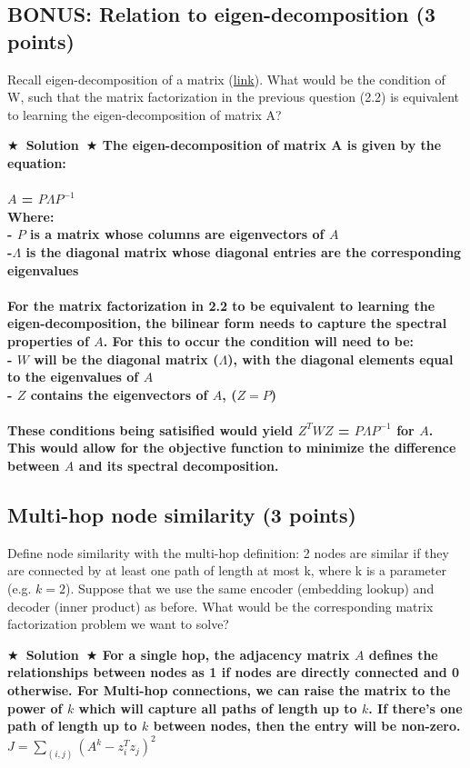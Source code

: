 \documentclass{article}
\numberwithin{figure}{section}
\newcommand{\Solution}[1]{{\medskip \color{red} \bf $\bigstar$~\sf \textbf{Solution}~$\bigstar$ \sf #1 } \bigskip}
\begin{document}
\subsection{BONUS: Relation to eigen-decomposition (3 points)}
Recall eigen-decomposition of a matrix (\href{https://en.wikipedia.org/wiki/Eigendecomposition_of_a_matrix}{link}). What would be the condition of W, such that the matrix factorization in the previous question (2.2) is equivalent to learning the eigen-decomposition of matrix A?

\Solution{
The eigen-decomposition of matrix A is given by the equation: \\
\\
$A$ = $PΛP^{-1}$ \\
Where:\\
- $P$ is a matrix whose columns are eigenvectors of $A$\\
-$Λ$ is the diagonal matrix whose diagonal entries are the corresponding eigenvalues\\\\

For the matrix factorization in 2.2 to be equivalent to learning the eigen-decomposition, the bilinear form needs to capture the spectral properties of $A$. For this to occur the condition will need to be:\\
- $W$ will be the diagonal matrix ($Λ$), with the diagonal elements equal to the eigenvalues of $A$\\
- $Z$ contains the eigenvectors of $A$, ($Z=P$)\\
\\
These conditions being satisified would yield $Z^{T}WZ$ = $PΛP^{-1}$ for $A$. This would allow for the objective function to minimize the difference between $A$ and its spectral decomposition.


}

\subsection{Multi-hop node similarity (3 points)}
Define node similarity with the multi-hop definition: 2 nodes are similar if they are connected by at least one path of length at most k, where k is a parameter (e.g. $k = 2$). Suppose that we use the same encoder (embedding lookup) and decoder (inner product) as before. What would be the corresponding matrix factorization problem we want to solve?

\Solution{
For a single hop, the adjacency matrix $A$ defines the relationships between nodes as 1 if nodes are directly connected and 0 otherwise. For Multi-hop connections, we can raise the matrix to the power of $k$ which will capture all paths of length up to $k$. If there's one path of length up to $k$ between nodes, then the entry will be non-zero.\\

$J = \sum_{(i,j)}(A^k - z_i^{T}z_j)^2$
\\\\

}
\end{document}
